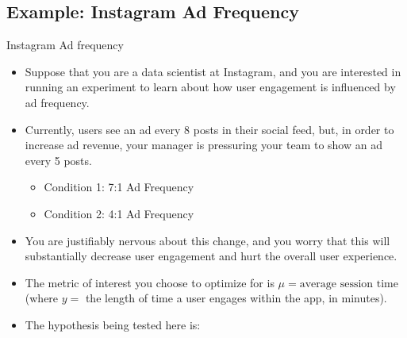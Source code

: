 \subsection{Example: Instagram Ad Frequency}
\begin{Example}{Instagram Ad frequency}{}
      \begin{itemize}
            \item Suppose that you are a data scientist at Instagram, and you are interested
                  in running an experiment to learn about how user engagement is influenced by ad frequency.
            \item Currently, users see an ad every 8 posts in their social feed, but, in order
                  to increase ad revenue, your manager is pressuring your team to show an ad every 5 posts.
                  \begin{itemize}
                        \item Condition 1: 7:1 Ad Frequency
                        \item Condition 2: 4:1 Ad Frequency
                  \end{itemize}
            \item You are justifiably nervous about this change, and you worry that this
                  will substantially decrease user engagement and hurt the overall user experience.
            \item The metric of interest you choose to optimize for is $ \mu=\text{average session time} $
                  (where $ y =$ the length of time a user engages within the app, in minutes).
            \item The hypothesis being tested here is:


\end{itemize}
\end{Example}
